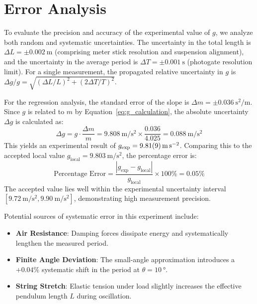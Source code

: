 \section{Error Analysis}
To evaluate the precision and accuracy of the experimental value of $g$, we analyze both random and systematic uncertainties.
The uncertainty in the total length is $\Delta L = \pm \SI{0.002}{\meter}$ (comprising meter stick resolution and suspension alignment), and the uncertainty in the average period is $\Delta T = \pm \SI{0.001}{\second}$ (photogate resolution limit).
For a single measurement, the propagated relative uncertainty in $g$ is $\Delta g / g = \sqrt{(\Delta L / L)^2 + (2 \Delta T / T)^2}$.

For the regression analysis, the standard error of the slope is $\Delta m = \pm\SI{0.036}{\second\squared\per\meter}$. Since $g$ is related to $m$ by Equation~\eqref{eq:g_calculation}, the absolute uncertainty $\Delta g$ is calculated as:
\begin{equation}
  \Delta g = g \cdot \frac{\Delta m}{m} = \SI{9.808}{\meter\per\second\squared} \times \frac{0.036}{4.025} = \SI{0.088}{\meter\per\second\squared}
  \label{eq:propagation}
\end{equation}
This yields an experimental result of $g_{\text{exp}} = \SI{9.81 \pm 0.09}{\meter\per\second\squared}$.
Comparing this to the accepted local value $g_{\text{local}} = \SI{9.803}{\meter\per\second\squared}$, the percentage error is:
\begin{equation}
  \text{Percentage Error} = \frac{|g_{\text{exp}} - g_{\text{local}}|}{g_{\text{local}}} \times 100\% = 0.05\%
  \label{eq:percent_error}
\end{equation}
The accepted value lies well within the experimental uncertainty interval $[\SI{9.72}{\meter\per\second\squared}, \SI{9.90}{\meter\per\second\squared}]$, demonstrating high measurement precision.

Potential sources of systematic error in this experiment include:
\begin{itemize}
  \item \textbf{Air Resistance}: Damping forces dissipate energy and systematically lengthen the measured period.
  \item \textbf{Finite Angle Deviation}: The small-angle approximation introduces a $+0.04\%$ systematic shift in the period at $\theta = \SI{10}{\degree}$.
  \item \textbf{String Stretch}: Elastic tension under load slightly increases the effective pendulum length $L$ during oscillation.
\end{itemize}

